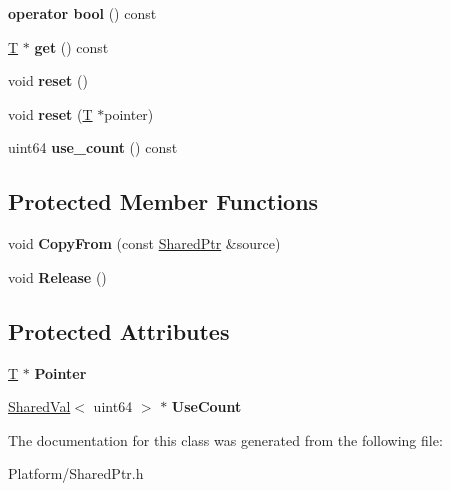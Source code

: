 \begin{DoxyCompactItemize}
{\bfseries operator bool} () const
\item 
\mbox{\label{class_gost_crypt_1_1_shared_ptr_a6a576b7006f9c3fa325e3f973e63329b}} 
\hyperlink{_stribog_8c_aba2f4c400d7a4c0bf0296be622087314}{T} $\ast$ {\bfseries get} () const
\item 
\mbox{\label{class_gost_crypt_1_1_shared_ptr_adac613dfcbf3c73968a376bc3cf394e2}} 
void {\bfseries reset} ()
\item 
\mbox{\label{class_gost_crypt_1_1_shared_ptr_a7e05a1997d77d97da62e17bffc79fcec}} 
void {\bfseries reset} (\hyperlink{_stribog_8c_aba2f4c400d7a4c0bf0296be622087314}{T} $\ast$pointer)
\item 
\mbox{\label{class_gost_crypt_1_1_shared_ptr_ad695c0ff3c96dbadd1a65e7f7aa03e4d}} 
uint64 {\bfseries use\+\_\+count} () const
\end{DoxyCompactItemize}
\subsection*{Protected Member Functions}
\begin{DoxyCompactItemize}
\item 
\mbox{\label{class_gost_crypt_1_1_shared_ptr_a4eba358497949cb9bc00ad4d8783778b}} 
void {\bfseries Copy\+From} (const \hyperlink{class_gost_crypt_1_1_shared_ptr}{Shared\+Ptr} \&source)
\item 
\mbox{\label{class_gost_crypt_1_1_shared_ptr_a216cd42fbb7cc696c2db126dbb4e1428}} 
void {\bfseries Release} ()
\end{DoxyCompactItemize}
\subsection*{Protected Attributes}
\begin{DoxyCompactItemize}
\item 
\mbox{\label{class_gost_crypt_1_1_shared_ptr_a994c644e1e01bc2a71cc83d3c95be5a6}} 
\hyperlink{_stribog_8c_aba2f4c400d7a4c0bf0296be622087314}{T} $\ast$ {\bfseries Pointer}
\item 
\mbox{\label{class_gost_crypt_1_1_shared_ptr_a3ad249f21933f90c932548a2e90c2370}} 
\hyperlink{class_gost_crypt_1_1_shared_val}{Shared\+Val}$<$ uint64 $>$ $\ast$ {\bfseries Use\+Count}
\end{DoxyCompactItemize}


The documentation for this class was generated from the following file\+:\begin{DoxyCompactItemize}
\item 
Platform/Shared\+Ptr.\+h\end{DoxyCompactItemize}
